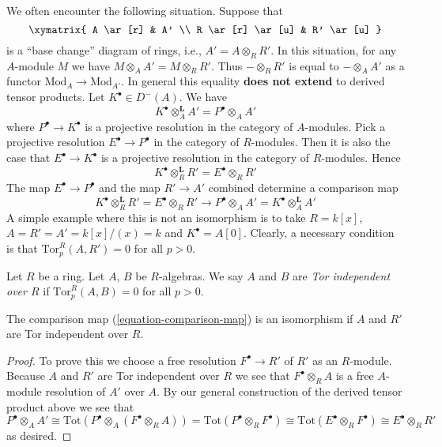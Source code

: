 \noindent
We often encounter the following situation. Suppose that
$$
\xymatrix{
A \ar[r] & A' \\
R \ar[r] \ar[u] & R' \ar[u]
}
$$
is a ``base change'' diagram of rings, i.e., $A' = A \otimes_R R'$.
In this situation, for any $A$-module $M$ we have
$M \otimes_A A' = M \otimes_R R'$. Thus $- \otimes_R R'$
is equal to $- \otimes_A A'$ as a functor $\text{Mod}_A \to \text{Mod}_{A'}$.
In general this equality {\bf does not extend} to derived tensor products.
Let $K^\bullet \in D^{-}(A)$. We have
$$
K^\bullet \otimes_A^{\mathbf{L}} A' = P^\bullet \otimes_A A'
$$
where $P^\bullet \to K^\bullet$ is a projective resolution in the
category of $A$-modules. Pick a projective resolution
$E^\bullet \to P^\bullet$ in the category of $R$-modules.
Then it is also the case that $E^\bullet \to K^\bullet$ is a projective
resolution in the category of $R$-modules. Hence
$$
K^\bullet \otimes_R^{\mathbf{L}} R' = E^\bullet \otimes_R R'
$$
The map $E^\bullet \to P^\bullet$ and the map $R' \to A'$
combined determine a comparison map
\begin{equation}
\label{equation-comparison-map}
K^\bullet \otimes_R^{\mathbf{L}} R' =
E^\bullet \otimes_R R'
\longrightarrow
P^\bullet \otimes_A A' =
K^\bullet \otimes_A^{\mathbf{L}} A'
\end{equation}
A simple example where this is not an isomorphism is to take
$R = k[x]$, $A = R' = A' = k[x]/(x) = k$ and $K^\bullet = A[0]$.
Clearly, a necessary condition is that $\text{Tor}_p^R(A, R') = 0$
for all $p > 0$.

\begin{definition}
\label{definition-tor-independent}
Let $R$ be a ring. Let $A$, $B$ be $R$-algebras. We say
$A$ and $B$ are {\it Tor independent over $R$} if
$\text{Tor}_p^R(A, B) = 0$ for all $p > 0$.
\end{definition}

\begin{lemma}
\label{lemma-base-change-comparison}
The comparison map (\ref{equation-comparison-map}) is an isomorphism
if $A$ and $R'$ are Tor independent over $R$.
\end{lemma}

\begin{proof}
To prove this we choose a free resolution $F^\bullet \to R'$
of $R'$ as an $R$-module. Because $A$ and $R'$ are Tor independent over $R$
we see that $F^\bullet \otimes_R A$ is a free $A$-module resolution of $A'$
over $A$. By our general construction of the derived tensor product
above we see that
$$
P^\bullet \otimes_A A' \cong
\text{Tot}(P^\bullet \otimes_A (F^\bullet \otimes_R A)) =
\text{Tot}(P^\bullet \otimes_R F^\bullet) \cong
\text{Tot}(E^\bullet \otimes_R F^\bullet) \cong
E^\bullet \otimes_R R'
$$
as desired.
\end{proof}

